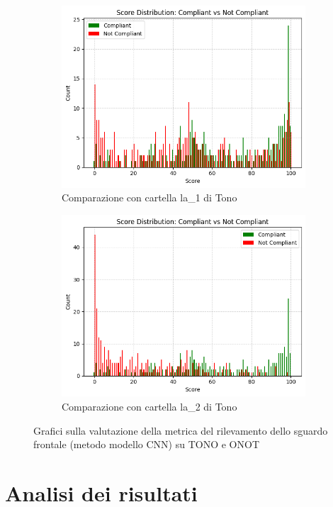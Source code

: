 \documentclass[12pt,a4paper,openright,twoside]{book}
\begin{document}
\begin{figure}[htbp]
    \centering
    \begin{subfigure}{0.49\textwidth}
        \centering
        \includegraphics[width=.7\linewidth]{figures/score-distribution-frontal-gaze-gdd-v3-la1.png}
        \caption{Comparazione con cartella la\_1 di Tono}
        \label{fig:score_distribution_frontal_gaze_gdd_v3_la1}
    \end{subfigure}
    \hfill
    \begin{subfigure}{0.49\textwidth}
        \centering
        \includegraphics[width=.7\linewidth]{figures/score-distribution-frontal-gaze-gdd-v3-la2.png}
        \caption{Comparazione con cartella la\_2 di Tono}
        \label{fig:score_distribution_frontal_gaze_gdd_v3_la2}
    \end{subfigure}

    \caption{Grafici sulla valutazione della metrica del rilevamento dello sguardo frontale (metodo modello CNN) su TONO e ONOT}
\end{figure}

\chapter{Analisi dei risultati}
\end{document}
